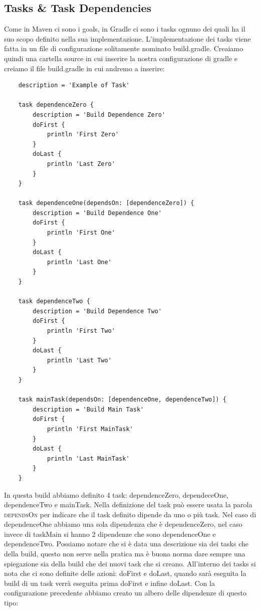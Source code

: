 \subsection{Tasks \& Task Dependencies}
Come in Maven ci sono i goals, in Gradle ci sono i tasks ognuno dei quali ha il suo scopo definito nella sua implementazione. L'implementazione dei tasks viene fatta in un file di configurazione solitamente nominato build.gradle. Creaiamo quindi una cartella source in cui inserire la nostra configurazione di gradle e creiamo il file build.gradle in cui andremo a inserire:

\begin{verbatim}
    description = 'Example of Task'

    task dependenceZero {
        description = 'Build Dependence Zero'
        doFirst {
            println 'First Zero'
        }
        doLast {
            println 'Last Zero'
        }
    }

    task dependenceOne(dependsOn: [dependenceZero]) {
        description = 'Build Dependence One'
        doFirst {
            println 'First One'
        }
        doLast {
            println 'Last One'
        }
    }

    task dependenceTwo {
        description = 'Build Dependence Two'
        doFirst {
            println 'First Two'
        }
        doLast {
            println 'Last Two'
        }
    }

    task mainTask(dependsOn: [dependenceOne, dependenceTwo]) {
        description = 'Build Main Task'
        doFirst {
            println 'First MainTask'
        }
        doLast {
            println 'Last MainTask'
        }
    }
\end{verbatim}

In questa build abbiamo definito 4 task: dependenceZero, dependeceOne, dependenceTwo e mainTask. Nella definizione del task può essere usata la parola \textsc{dependsOn} per indicare che il task definito dipende da uno o più task. Nel caso di dependenceOne abbiamo una sola dipendenza che è dependenceZero, nel caso invece di taskMain si hanno 2 dipendenze che sono dependenceOne e dependenceTwo. Possiamo notare che si è data una descrizione sia dei tasks che della build, questo non serve nella pratica ma è buona norma dare sempre una spiegazione sia della build che dei nuovi task che si creano. All'interno dei tasks si nota che ci sono definite delle azioni: doFirst e doLast, quando sarà eseguita la build di un task verrà eseguita prima doFirst e infine doLast. Con la configurazione precedente abbiamo creato un albero delle dipendenze di questo tipo:

